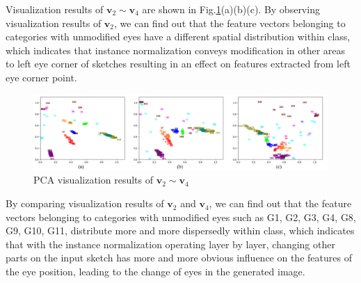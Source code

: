 \documentclass[10pt,twocolumn,letterpaper]{article}
\begin{document}
Visualization results of $\boldsymbol{v}_2 \sim \boldsymbol{v}_4$ are shown in Fig.\ref{fig:pca_2}(a)(b)(c). 
By observing visualization results of $\boldsymbol{v}_2$, we can find out that the feature vectors belonging to categories with unmodified eyes have a different spatial distribution within class, which indicates that instance normalization conveys modification in other areas to left eye corner of sketches resulting in an effect on features extracted from left eye corner point. 
\begin{figure}[htb]
	\centering
	\includegraphics[width=0.8 \textwidth]{pca_2.png}
	\caption{PCA visualization results of $\boldsymbol{v}_2 \sim \boldsymbol{v}_4$}
	\label{fig:pca_2}
\end{figure}
By comparing visualization results of $\boldsymbol{v}_2$ and $\boldsymbol{v}_4$, we can find out that the feature vectors belonging to categories with unmodified eyes such as G1, G2, G3, G4, G8, G9, G10, G11, distribute more and more dispersedly within class, which indicates that with the instance normalization operating layer by layer, changing other parts on the input sketch has more and more obvious influence on the features of the eye position, leading to the change of eyes in the generated image.
\end{document}
